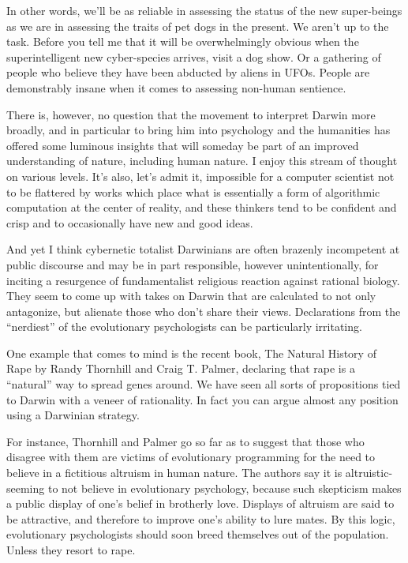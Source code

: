 \documentclass[letterpaper,12pt,english]{sphinxmanual}
\begin{document}
In other words, we'll be as reliable in assessing the status of the new super-beings as we are in assessing the traits of pet dogs in the present. We aren't up to the task. Before you tell me that it will be overwhelmingly obvious when the superintelligent new cyber-species arrives, visit a dog show. Or a gathering of people who believe they have been abducted by aliens in UFOs. People are demonstrably insane when it comes to assessing non-human sentience.

There is, however, no question that the movement to interpret Darwin more broadly, and in particular to bring him into psychology and the humanities has offered some luminous insights that will someday be part of an improved understanding of nature, including human nature. I enjoy this stream of thought on various levels. It's also, let's admit it, impossible for a computer scientist not to be flattered by works which place what is essentially a form of algorithmic computation at the center of reality, and these thinkers tend to be confident and crisp and to occasionally have new and good ideas.

And yet I think cybernetic totalist Darwinians are often brazenly incompetent at public discourse and may be in part responsible, however unintentionally, for inciting a resurgence of fundamentalist religious reaction against rational biology. They seem to come up with takes on Darwin that are calculated to not only antagonize, but alienate those who don't share their views. Declarations from the ``nerdiest'' of the evolutionary psychologists can be particularly irritating.

One example that comes to mind is the recent book, The Natural History of Rape by Randy Thornhill and Craig T. Palmer, declaring that rape is a ``natural'' way to spread genes around. We have seen all sorts of propositions tied to Darwin with a veneer of rationality. In fact you can argue almost any position using a Darwinian strategy.

For instance, Thornhill and Palmer go so far as to suggest that those who disagree with them are victims of evolutionary programming for the need to believe in a fictitious altruism in human nature. The authors say it is altruistic-seeming to not believe in evolutionary psychology, because such skepticism makes a public display of one's belief in brotherly love. Displays of altruism are said to be attractive, and therefore to improve one's ability to lure mates. By this logic, evolutionary psychologists should soon breed themselves out of the population. Unless they resort to rape.
\end{document}
